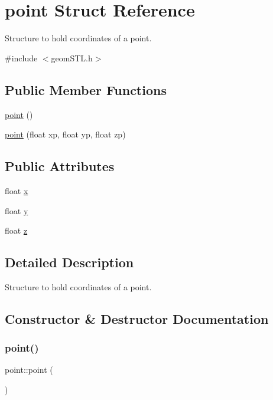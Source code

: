 \hypertarget{structpoint}{}\section{point Struct Reference}
\label{structpoint}


Structure to hold coordinates of a point.  




{\ttfamily \#include $<$geom\+S\+T\+L.\+h$>$}

\subsection*{Public Member Functions}
\begin{DoxyCompactItemize}
\item 
\mbox{\hyperlink{structpoint_a5fe21d4a4539320bf0f5caf1218d31c8}{point}} ()
\item 
\mbox{\hyperlink{structpoint_aecb0ac3f8ece9589eac6ff62388075b5}{point}} (float xp, float yp, float zp)
\end{DoxyCompactItemize}
\subsection*{Public Attributes}
\begin{DoxyCompactItemize}
\item 
float \mbox{\hyperlink{structpoint_a8293fd2de3ce739deb6d53691fd21fcf}{x}}
\item 
float \mbox{\hyperlink{structpoint_a616ad85a2096d1566f5971666bbc3b3f}{y}}
\item 
float \mbox{\hyperlink{structpoint_a3c15cf62431e51a4d9432ca40b3b04f5}{z}}
\end{DoxyCompactItemize}


\subsection{Detailed Description}
Structure to hold coordinates of a point. 

\subsection{Constructor \& Destructor Documentation}
\mbox{\label{structpoint_a5fe21d4a4539320bf0f5caf1218d31c8}} 
\subsubsection{\texorpdfstring{point()}{point()}\hspace{0.1cm}{\footnotesize\ttfamily [1/2]}}
{\footnotesize\ttfamily point\+::point (\begin{DoxyParamCaption}{ }\end{DoxyParamCaption})\hspace{0.3cm}{\ttfamily [inline]}}

